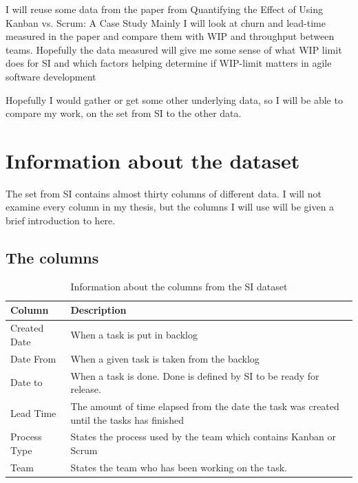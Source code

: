\documentclass[UKenglish]{ifimaster}  %
\begin{document}
I will reuse some data from the paper from Quantifying the Effect of Using Kanban vs. Scrum: A Case Study \parencite{Dag} Mainly I will look at churn and lead-time measured in the paper and compare them with WIP and throughput between teams. Hopefully the data measured will give me some sense of what WIP limit does for SI and which factors helping determine if WIP-limit matters in agile software development

Hopefully I would gather or get some other underlying data, so I will be able to compare my work, on the set from SI to the other data.

\section{Information about the dataset}
The set from SI contains almost thirty columns of different data. I will not examine every column in my thesis, but the columns I will use will be given a brief introduction to here.
\newpage
\subsection{The columns}
\begin{table}[ht]
\begin{center}
    \begin{tabular}{| l | p{5cm} |}
    \hline
     Column & Description\\ \hline
     Created Date & When a task is put in backlog \\ \hline
     Date From & When a given task is taken from the backlog\\ \hline
     Date to & When a task is done. Done is defined by SI to be ready for release. \\ \hline
    Lead Time & The amount of time elapsed from the date the task was created until the tasks has finished  \\ \hline
   Process Type &States the process used by the team which contains Kanban or Scrum \\
    \hline
    Team &States the team who has been working on the task.\\ \hline
    \end{tabular}
\caption{Information about the columns from the SI dataset}
\label{IC} %
\end{center}
\end{table}
\end{document}
